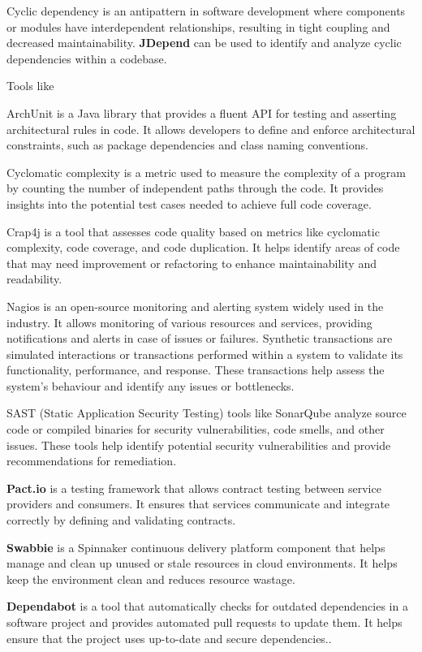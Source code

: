 \documentclass[main.tex]{subfiles}
\begin{document}
Cyclic dependency is an antipattern in software development where components or modules have interdependent relationships, resulting in tight coupling and decreased maintainability. \textbf{JDepend }can be used to identify and analyze cyclic dependencies within a codebase. 

Tools like 

ArchUnit is a Java library that provides a fluent API for testing and asserting architectural rules in code. It allows developers to define and enforce architectural constraints, such as package dependencies and class naming conventions.

Cyclomatic complexity is a metric used to measure the complexity of a program by counting the number of independent paths through the code. It provides insights into the potential test cases needed to achieve full code coverage.

Crap4j is a tool that assesses code quality based on metrics like cyclomatic complexity, code coverage, and code duplication. It helps identify areas of code that may need improvement or refactoring to enhance maintainability and readability.  


Nagios is an open-source monitoring and alerting system widely used in the industry. It allows monitoring of various resources and services, providing notifications and alerts in case of issues or failures. Synthetic transactions are simulated interactions or transactions performed within a system to validate its functionality, performance, and response. These transactions help assess the system's behaviour and identify any issues or bottlenecks.




{SAST} (Static Application Security Testing) tools like SonarQube analyze source code or compiled binaries for security vulnerabilities, code smells, and other issues. These tools help identify potential security vulnerabilities and provide recommendations for remediation.


\textbf{Pact.io }is a testing framework that allows contract testing between service providers and consumers. It ensures that services communicate and integrate correctly by defining and validating contracts.

\textbf{Swabbie} is a Spinnaker continuous delivery platform component that helps manage and clean up unused or stale resources in cloud environments. It helps keep the environment clean and reduces resource wastage.

\textbf{Dependabot} is a tool that automatically checks for outdated dependencies in a software project and provides automated pull requests to update them. It helps ensure that the project uses up-to-date and secure dependencies.. 
\end{document}
